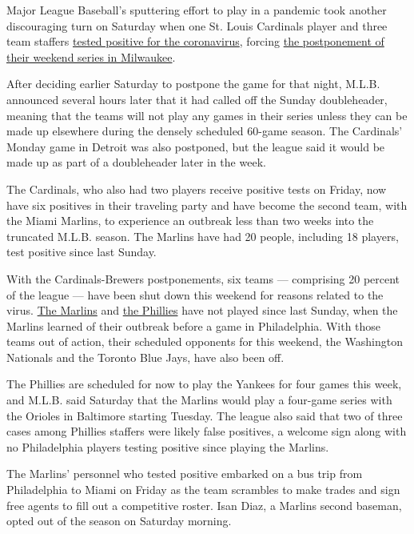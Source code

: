 Major League Baseball's sputtering effort to play in a pandemic took
another discouraging turn on Saturday when one St. Louis Cardinals
player and three team staffers
\href{https://www.nytimes3xbfgragh.onion/2020/08/03/sports/baseball/mlb-coronavirus-outbreak.html}{tested
positive for the coronavirus}, forcing
\href{https://www.nytimes3xbfgragh.onion/2020/07/31/sports/baseball/cardinals-twins-coronavirus-mlb.html}{the
postponement of their weekend series in Milwaukee}.

After deciding earlier Saturday to postpone the game for that night,
M.L.B. announced several hours later that it had called off the Sunday
doubleheader, meaning that the teams will not play any games in their
series unless they can be made up elsewhere during the densely scheduled
60-game season. The Cardinals' Monday game in Detroit was also
postponed, but the league said it would be made up as part of a
doubleheader later in the week.

The Cardinals, who also had two players receive positive tests on
Friday, now have six positives in their traveling party and have become
the second team, with the Miami Marlins, to experience an outbreak less
than two weeks into the truncated M.L.B. season. The Marlins have had 20
people, including 18 players, test positive since last Sunday.

With the Cardinals-Brewers postponements, six teams --- comprising 20
percent of the league --- have been shut down this weekend for reasons
related to the virus.
\href{https://www.nytimes3xbfgragh.onion/2020/07/28/sports/baseball/marlins-outbreak-mlb-coronavirus.html}{The
Marlins} and
\href{https://www.nytimes3xbfgragh.onion/2020/07/30/sports/baseball/phillies-blue-jays-postponed-coronavirus.html}{the
Phillies} have not played since last Sunday, when the Marlins learned of
their outbreak before a game in Philadelphia. With those teams out of
action, their scheduled opponents for this weekend, the Washington
Nationals and the Toronto Blue Jays, have also been off.

The Phillies are scheduled for now to play the Yankees for four games
this week, and M.L.B. said Saturday that the Marlins would play a
four-game series with the Orioles in Baltimore starting Tuesday. The
league also said that two of three cases among Phillies staffers were
likely false positives, a welcome sign along with no Philadelphia
players testing positive since playing the Marlins.

The Marlins' personnel who tested positive embarked on a bus trip from
Philadelphia to Miami on Friday as the team scrambles to make trades and
sign free agents to fill out a competitive roster. Isan Diaz, a Marlins
second baseman, opted out of the season on Saturday morning.


